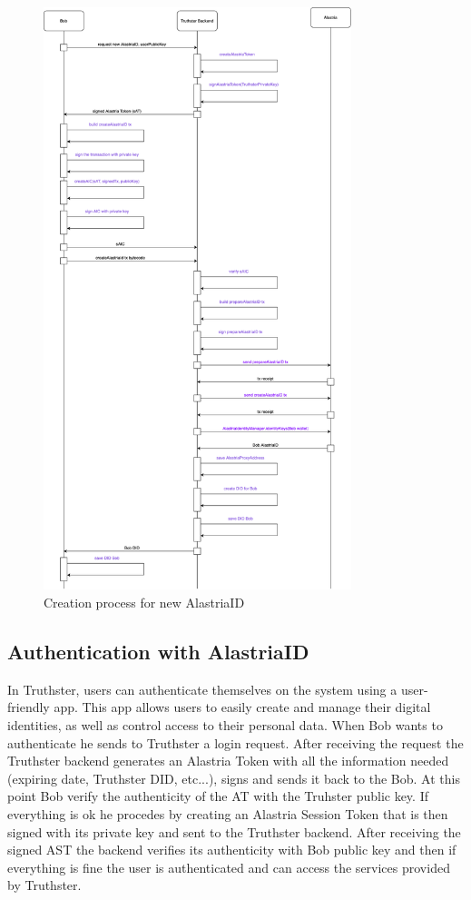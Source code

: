 \documentclass[target=mst,aauheader=]{thud}
\begin{document}
\begin{figure}
    \centering
    \includegraphics[width=0.8\textwidth]{images/createNewAlastriaID.png}
    \caption{Creation process for new AlastriaID}
    \label{fig:addAlastriaID}

\end{figure}

\subsection{Authentication with AlastriaID}

In Truthster, users can authenticate themselves on the system using a user-friendly app. This app allows users to easily create and manage their digital identities, as well as control access to their personal data.
When Bob wants to authenticate he sends to Truthster a login request. After receiving the request the Truthster backend generates an Alastria Token with all the information needed (expiring date, Truthster DID, etc...), signs and sends it back to the Bob. At this point Bob verify the authenticity of the AT with the Truhster public key. If everything is ok he procedes by creating an Alastria Session Token that is then signed with its private key and sent to the Truthster backend. After receiving the signed AST the backend verifies its authenticity with Bob public key and then if everything is fine the user is authenticated and can access the services provided by Truthster.
\end{document}
